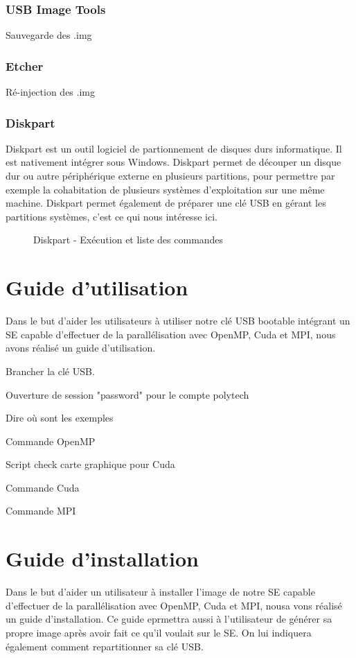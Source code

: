 \documentclass[final]{polytech/polytech}
\begin{document}
\section{USB Image Tools} %
Sauvegarde des .img

\section{Etcher} %
Ré-injection des .img

\section{Diskpart}
Diskpart est un outil logiciel de partionnement de disques durs informatique. Il est nativement intégrer sous Windows. Diskpart permet de découper un disque dur ou autre périphérique externe en plusieurs partitions, pour permettre par exemple la cohabitation de plusieurs systèmes d’exploitation sur une même machine. Diskpart permet également de préparer une clé USB en gérant les partitions systèmes, c’est ce qui nous intéresse ici.

\begin{figure}
	\caption{Diskpart - Exécution et liste des commandes}
	\label{fig:diskpart}
\end{figure}

\part{Guide d'utilisation} %
Dans le but d'aider les utilisateurs à utiliser notre clé USB bootable intégrant un SE capable d'effectuer de la parallélisation avec OpenMP, Cuda et MPI, nous avons réalisé un guide d'utilisation.

Brancher la clé USB.

Ouverture de session "password" pour le compte polytech

Dire où sont les exemples

Commande OpenMP

Script check carte graphique pour Cuda

Commande Cuda

Commande MPI

\part{Guide d'installation} %
Dans le but d'aider un utilisateur à installer l'image de notre SE capable d'effectuer de la parallélisation avec OpenMP, Cuda et MPI, nousa vons réalisé un guide d'installation. Ce guide eprmettra aussi à l'utilisateur de générer sa propre image après avoir fait ce qu'il voulait sur le SE. On lui indiquera également comment repartitionner sa clé USB.
\end{document}
